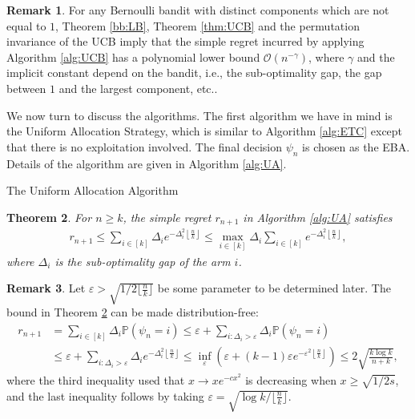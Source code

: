 \documentclass[letterpaper,11pt,openright,openany]{book}
\numberwithin{equation}{section}
\theoremstyle{plain}
\newtheorem{Th}{Theorem}[section]
\theoremstyle{definition}
\newtheorem{Rem}[Th]{Remark}
\def\P{{\mathbb P}}
\def\e{{\varepsilon}}
\DeclareMathOperator*{\argmax}{arg\,max}
\begin{document}
\begin{Rem}
For any Bernoulli bandit with distinct components which are not equal to $1$, Theorem \ref{bb:LB}, Theorem \ref{thm:UCB} and the permutation invariance of the UCB imply that the simple regret incurred by applying Algorithm \ref{alg:UCB} has a polynomial lower bound $\mathcal O(n^{-\gamma})$, where $\gamma$ and the implicit constant depend on the bandit, i.e., the sub-optimality gap, the gap between $1$ and the largest component, etc.. 
\end{Rem}

We now turn to discuss the algorithms. The first algorithm we have in mind is the Uniform Allocation Strategy, which is similar to Algorithm \ref{alg:ETC} except that there is no exploitation involved. The final decision $\psi_n$ is chosen as the EBA. Details of the algorithm are given in Algorithm \ref{alg:UA}. 

\begin{algorithm}[H]
\begin{algorithmic}[1]
\STATE{$\psi_{n}=\argmax_{i\in [k]}\hat{\mu}_i$}
\end{algorithmic}
\caption{The Uniform Allocation Algorithm} 
\label{alg:UA}
\end{algorithm}

\begin{Th}\label{th:UA}
For $n\geq k$, the simple regret $r_{n+1}$ in Algorithm \ref{alg:UA} satisfies
\begin{align}
r_{n+1}\leq\sum_{i\in [k]}\Delta_ie^{-\Delta_i^2\left\lfloor\frac{n}{k}\right\rfloor}\leq\max_{i\in [k]}\Delta_i\sum_{i\in [k]}e^{-\Delta_i^2\left\lfloor\frac{n}{k}\right\rfloor},\label{ba1}
\end{align}
where $\Delta_i$ is the sub-optimality gap of the arm $i$. 
\end{Th}
\begin{Rem}
Let $\e>\sqrt{1/2\lfloor\frac{n}{k}\rfloor}$ be some parameter to be determined later. The bound in Theorem \ref{th:UA} can be made distribution-free:
\begin{align*}
r_{n+1}&=\sum_{i\in [k]}\Delta_i\P\left(\psi_n=i\right)\leq\e +\sum_{i: \Delta_i>\e}\Delta_i\P\left(\psi_n=i\right)\\
&\leq\e +\sum_{i: \Delta_i>\e}\Delta_ie^{-\Delta_i^2\left\lfloor\frac{n}{k}\right\rfloor}\leq\inf_{\e}\left(\e+(k-1)\e e^{-\e^2\left\lfloor\frac{n}{k}\right\rfloor}\right)\leq 2\sqrt{\frac{k\log k}{n+k}}, 
\end{align*}
where the third inequality used that $x\to xe^{-cx^2}$ is decreasing when $x\geq\sqrt{1/2s}$, and the last inequality follows by taking $\e=\sqrt{\log k/\lfloor\frac{n}{k}\rfloor}$.   
\end{Rem}
\end{document}
